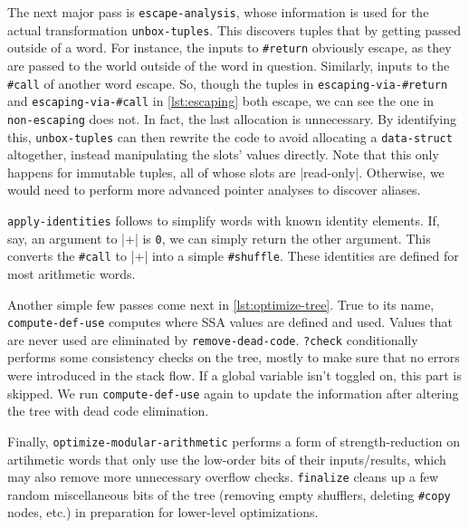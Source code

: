 
The next major pass is \Verb|escape-analysis|, whose information is used for
the actual transformation \Verb|unbox-tuples|.  This discovers tuples that
 by getting passed outside of a word.  For instance, the inputs to
\Verb|#return| obviously escape, as they are passed to the world outside of
the word in question.  Similarly, inputs to the \Verb|#call| of another word
escape.  So, though the tuples in \Verb|escaping-via-#return| and
\Verb|escaping-via-#call| in \vref{lst:escaping} both escape, we can see the
one in \Verb|non-escaping| does not.  In fact, the last allocation is
unnecessary.  By identifying this, \Verb|unbox-tuples| can then rewrite the
code to avoid allocating a \Verb|data-struct| altogether, instead
manipulating the slots' values directly.  Note that this only happens for
immutable tuples, all of whose slots are \factor|read-only|.  Otherwise, we
would need to perform more advanced pointer analyses to discover aliases.

\Verb|apply-identities| follows to simplify words with known identity
elements.  If, say, an argument to \factor|+| is \Verb|0|, we can simply
return the other argument.  This converts the \Verb|#call| to \factor|+| into
a simple \Verb|#shuffle|.  These identities are defined for most arithmetic
words.

Another simple few passes come next in \vref{lst:optimize-tree}.  True to its
name, \Verb|compute-def-use| computes where \gls{SSA} values are defined and
used.  Values that are never used are eliminated by \Verb|remove-dead-code|.
\Verb|?check| conditionally performs some consistency checks on the tree,
mostly to make sure that no errors were introduced in the stack flow.  If a
global variable isn't toggled on, this part is skipped.  We run
\Verb|compute-def-use| again to update the information after altering the
tree with dead code elimination.

Finally, \Verb|optimize-modular-arithmetic| performs a form of
strength-reduction on artihmetic words that only use the low-order bits of
their inputs/results, which may also remove more unnecessary overflow checks.
\Verb|finalize| cleans up a few random miscellaneous bits of the tree
(removing empty shufflers, deleting \Verb|#copy| nodes, etc.) in preparation
for lower-level optimizations.

